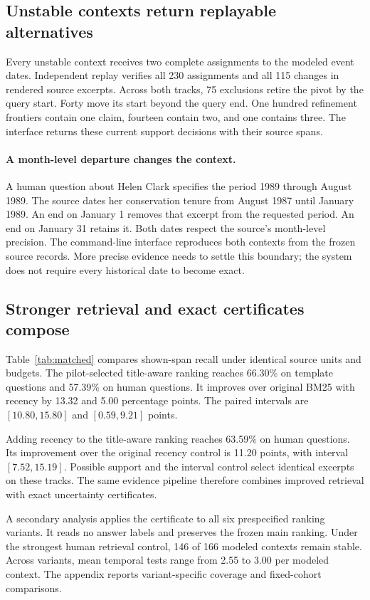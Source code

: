 \subsection{Unstable contexts return replayable alternatives}

Every unstable context receives two complete assignments to the modeled event dates.
Independent replay verifies all 230 assignments and all 115 changes in rendered source excerpts.
Across both tracks, 75 exclusions retire the pivot by the query start.
Forty move its start beyond the query end.
One hundred refinement frontiers contain one claim, fourteen contain two, and one contains three.
The interface returns these current support decisions with their source spans.

\paragraph{A month-level departure changes the context.}
A human question about Helen Clark specifies the period 1989 through August 1989.
The source dates her conservation tenure from August 1987 until January 1989.
An end on January 1 removes that excerpt from the requested period.
An end on January 31 retains it.
Both dates respect the source's month-level precision.
The command-line interface reproduces both contexts from the frozen source records.
More precise evidence needs to settle this boundary; the system does not require every historical date to become exact.

\subsection{Stronger retrieval and exact certificates compose}

Table~\ref{tab:matched} compares shown-span recall under identical source units and budgets.
The pilot-selected title-aware ranking reaches 66.30\% on template questions and 57.39\% on human questions.
It improves over original BM25 with recency by 13.32 and 5.00 percentage points.
The paired intervals are $[10.80,15.80]$ and $[0.59,9.21]$ points.


Adding recency to the title-aware ranking reaches 63.59\% on human questions.
Its improvement over the original recency control is 11.20 points, with interval $[7.52,15.19]$.
Possible support and the interval control select identical excerpts on these tracks.
The same evidence pipeline therefore combines improved retrieval with exact uncertainty certificates.

A secondary analysis applies the certificate to all six prespecified ranking variants.
It reads no answer labels and preserves the frozen main ranking.
Under the strongest human retrieval control, 146 of 166 modeled contexts remain stable.
Across variants, mean temporal tests range from 2.55 to 3.00 per modeled context.
The appendix reports variant-specific coverage and fixed-cohort comparisons.


